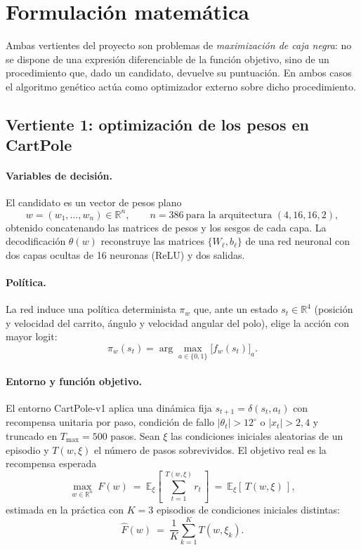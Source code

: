 \section{Formulación matemática}
\label{sec:formulacion}

Ambas vertientes del proyecto son problemas de \emph{maximización de caja negra}: no se dispone de una expresión diferenciable de la función objetivo, sino de un procedimiento que, dado un candidato, devuelve su puntuación. En ambos casos el algoritmo genético actúa como optimizador externo sobre dicho procedimiento.

\subsection{Vertiente 1: optimización de los pesos en CartPole}

\paragraph{Variables de decisión.}
El candidato es un vector de pesos plano
\begin{equation}
  w = (w_1, \dots, w_n) \in \mathbb{R}^n,
  \qquad n = 386 \ \text{para la arquitectura } (4,16,16,2),
\end{equation}
obtenido concatenando las matrices de pesos y los sesgos de cada capa. La decodificación $\theta(w)$ reconstruye las matrices $\{W_\ell, b_\ell\}$ de una red neuronal con dos capas ocultas de 16 neuronas (ReLU) y dos salidas.

\paragraph{Política.}
La red induce una política determinista $\pi_w$ que, ante un estado $s_t \in \mathbb{R}^4$ (posición y velocidad del carrito, ángulo y velocidad angular del polo), elige la acción con mayor logit:
\begin{equation}
  \pi_w(s_t) = \arg\max_{a \in \{0,1\}} \big[ f_w(s_t) \big]_a .
\end{equation}

\paragraph{Entorno y función objetivo.}
El entorno CartPole-v1 aplica una dinámica fija $s_{t+1} = \delta(s_t, a_t)$ con recompensa unitaria por paso, condición de fallo $|\theta_t| > 12^\circ$ o $|x_t| > 2{,}4$ y truncado en $T_{\max} = 500$ pasos. Sean $\xi$ las condiciones iniciales aleatorias de un episodio y $T(w, \xi)$ el número de pasos sobrevividos. El objetivo real es la recompensa esperada
\begin{equation}
  \label{eq:cartpole-objective}
  \max_{w \in \mathbb{R}^n} \ F(w)
  \ = \ \mathbb{E}_{\xi}\!\left[\, \sum_{t=1}^{T(w,\xi)} r_t \,\right]
  \ = \ \mathbb{E}_{\xi}\!\left[\, T(w, \xi) \,\right],
\end{equation}
estimada en la práctica con $K = 3$ episodios de condiciones iniciales distintas:
\begin{equation}
  \widehat{F}(w) \ = \ \frac{1}{K} \sum_{k=1}^{K} T(w, \xi_k).
\end{equation}

